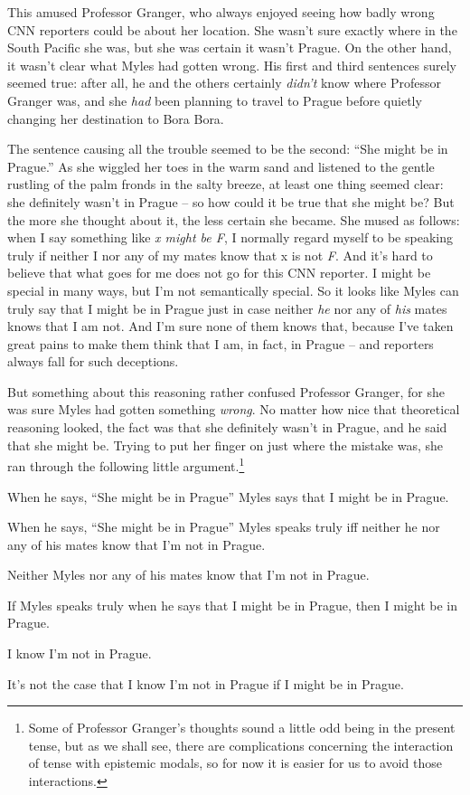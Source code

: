 \documentclass[
  11pt,
  letterpaper,
  DIV=11,
  numbers=noendperiod]{scrartcl}
\providecommand{\tightlist}{%
  \setlength{\itemsep}{0pt}\setlength{\parskip}{0pt}}\usepackage{longtable,booktabs,array}
\begin{document}
This amused Professor Granger, who always enjoyed seeing how badly wrong
CNN reporters could be about her location. She wasn't sure exactly where
in the South Pacific she was, but she was certain it wasn't Prague. On
the other hand, it wasn't clear what Myles had gotten wrong. His first
and third sentences surely seemed true: after all, he and the others
certainly \emph{didn't} know where Professor Granger was, and she
\emph{had} been planning to travel to Prague before quietly changing her
destination to Bora Bora.

The sentence causing all the trouble seemed to be the second: ``She
might be in Prague.'' As she wiggled her toes in the warm sand and
listened to the gentle rustling of the palm fronds in the salty breeze,
at least one thing seemed clear: she definitely wasn't in Prague -- so
how could it be true that she might be? But the more she thought about
it, the less certain she became. She mused as follows: when I say
something like \emph{x might be F}, I normally regard myself to be
speaking truly if neither I nor any of my mates know that x is not
\emph{F}. And it's hard to believe that what goes for me does not go for
this CNN reporter. I might be special in many ways, but I'm not
semantically special. So it looks like Myles can truly say that I might
be in Prague just in case neither \emph{he} nor any of \emph{his} mates
knows that I am not. And I'm sure none of them knows that, because I've
taken great pains to make them think that I am, in fact, in Prague --
and reporters always fall for such deceptions.

But something about this reasoning rather confused Professor Granger,
for she was sure Myles had gotten something \emph{wrong}. No matter how
nice that theoretical reasoning looked, the fact was that she definitely
wasn't in Prague, and he said that she might be. Trying to put her
finger on just where the mistake was, she ran through the following
little argument.\footnote{Some of Professor Granger's thoughts sound a
  little odd being in the present tense, but as we shall see, there are
  complications concerning the interaction of tense with epistemic
  modals, so for now it is easier for us to avoid those interactions.}

\begin{description}
\tightlist
\item[(1)]
When he says, ``She might be in Prague'' Myles says that I might be in
Prague.
\item[(2)]
When he says, ``She might be in Prague'' Myles speaks truly iff neither
he nor any of his mates know that I'm not in Prague.
\item[(3)]
Neither Myles nor any of his mates know that I'm not in Prague.
\item[(4)]
If Myles speaks truly when he says that I might be in Prague, then I
might be in Prague.
\item[(5)]
I know I'm not in Prague.
\item[(6)]
It's not the case that I know I'm not in Prague if I might be in Prague.
\end{description}
\end{document}
